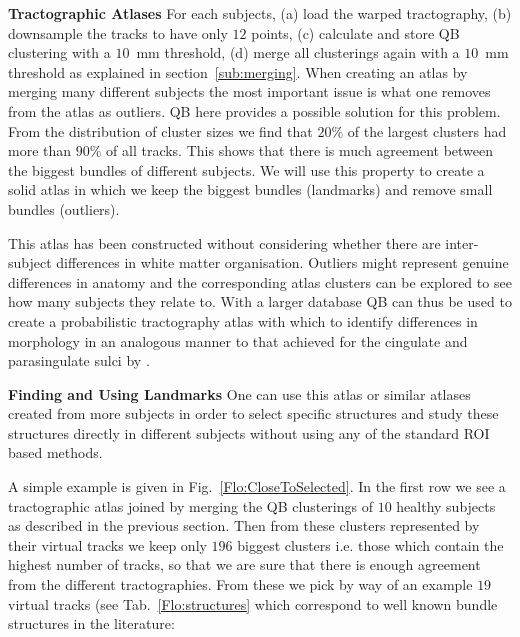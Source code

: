 \documentclass{bioinfo}
\begin{document}

\textbf{Tractographic Atlases} For each subjects, (a) load the warped
tractography, (b) downsample the tracks to have only $12$ points, (c) calculate
and store QB clustering with a $10$~mm threshold, (d) merge all
clusterings again with a $10$~mm threshold as explained in
section~\ref{sub:merging}. When creating an atlas by merging
many different subjects the most important issue is what one removes
from the atlas as outliers.  QB here provides a possible solution for
this problem. From the distribution of cluster sizes we find that $20\%$
of the largest clusters had more than $90\%$ of all tracks. This shows
that there is much agreement between the biggest bundles of different
subjects.  We will use this property to create a solid atlas in which we
keep the biggest bundles (landmarks) and remove small bundles
(outliers).

This atlas has been constructed without considering whether there are
inter-subject differences in white matter organisation. Outliers might
represent genuine differences in anatomy and the corresponding atlas
clusters can be explored to see how many subjects they relate to. With a
larger database QB can thus be used to create a probabilistic
tractography atlas with which to identify differences in morphology in
an analogous manner to that achieved for the cingulate and parasingulate
sulci by \citet{paus1996human}.

\textbf{Finding and Using Landmarks} One can use this atlas or similar
atlases created from more subjects in order to select specific
structures and study these structures directly in different subjects
without using any of the standard ROI based methods.

A simple example is given in Fig.~\ref{Flo:CloseToSelected}. In the
first row we see a tractographic atlas joined by merging the QB
clusterings of $10$ healthy subjects as described in the previous
section. Then from these clusters represented by their virtual tracks we
keep only $196$ biggest clusters i.e. those which contain the highest
number of tracks, so that we are sure that there is enough agreement
from the different tractographies. From these we pick by way of an
example $19$ virtual tracks (see Tab.~\ref{Flo:structures} which
correspond to well known bundle structures in the literature:
\end{document}
